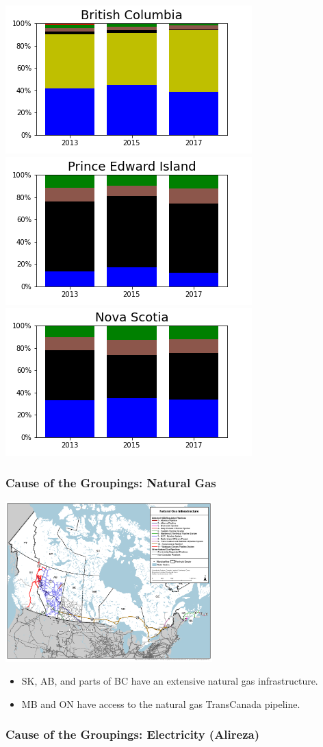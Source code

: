\documentclass{beamer}
\begin{document}
\begin{frame}
\includegraphics[width=0.25\linewidth]{bc.png}%
\includegraphics[width=0.25\linewidth]{pe.png}%
\includegraphics[width=0.25\linewidth]{ns.png}


\end{frame}


\begin{frame}

\frametitle{Cause of the Groupings: Natural Gas}

\begin{center}
\includegraphics[width=0.6\textwidth]{natural_gas_pipeline_natural_resources_canada}
\end{center}
\vspace{-10pt}

\small
\begin{itemize}
	\item SK, AB, and parts of BC have an extensive natural gas infrastructure.
	\item MB and ON have access to the natural gas TransCanada pipeline.
\end{itemize}
\normalsize
\end{frame}


\begin{frame}
\frametitle{Cause of the Groupings: Electricity (Alireza)}

\end{frame}
\end{document}
